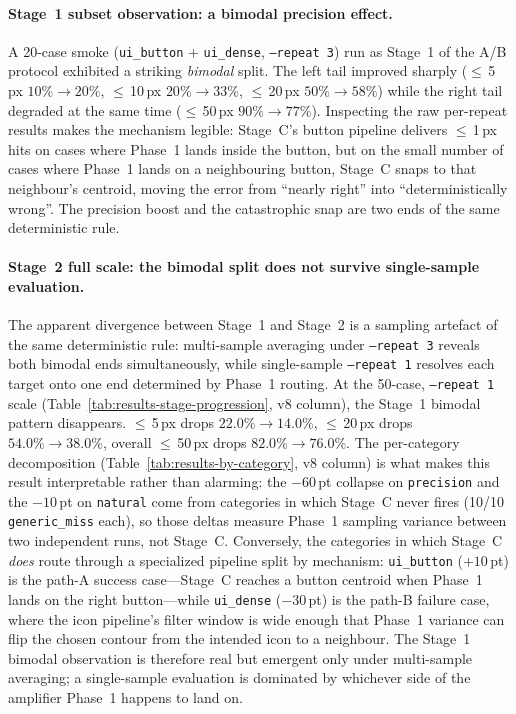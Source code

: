 \paragraph{Stage~1 subset observation: a bimodal precision effect.}
A 20-case smoke (\texttt{ui\_button} + \texttt{ui\_dense},
\texttt{--repeat 3}) run as Stage~1 of the A/B protocol exhibited a
striking \emph{bimodal} split.  The left tail improved sharply
($\leq$\,5\,px $10\% \to 20\%$, $\leq$\,10\,px $20\% \to 33\%$,
$\leq$\,20\,px $50\% \to 58\%$) while the right tail degraded at the
same time ($\leq$\,50\,px $90\% \to 77\%$).  Inspecting the raw
per-repeat results makes the mechanism legible: Stage~C's button
pipeline delivers $\leq$\,1\,px hits on cases where Phase~1 lands
inside the button, but on the small number of cases where Phase~1
lands on a neighbouring button, Stage~C snaps to that neighbour's
centroid, moving the error from ``nearly right'' into
``deterministically wrong''.  The precision boost and the
catastrophic snap are two ends of the same deterministic rule.

\paragraph{Stage~2 full scale: the bimodal split does not survive
  single-sample evaluation.}
The apparent divergence between Stage~1 and Stage~2 is a sampling
artefact of the same deterministic rule: multi-sample averaging under
\texttt{--repeat 3} reveals both bimodal ends simultaneously, while
single-sample \texttt{--repeat 1} resolves each target onto one end
determined by Phase~1 routing.
At the 50-case, \texttt{--repeat 1} scale
(Table~\ref{tab:results-stage-progression}, v8 column), the Stage~1 bimodal pattern
disappears.  $\leq$\,5\,px drops $22.0\% \to 14.0\%$, $\leq$\,20\,px
drops $54.0\% \to 38.0\%$, overall $\leq$\,50\,px drops
$82.0\% \to 76.0\%$.  The per-category decomposition
(Table~\ref{tab:results-by-category}, v8 column) is what makes this result
interpretable rather than alarming: the $-60$\,pt collapse on
\texttt{precision} and the $-10$\,pt on \texttt{natural} come from
categories in which Stage~C never fires (10/10
\texttt{generic\_miss} each), so those deltas measure Phase~1
sampling variance between two independent runs, not Stage~C.
Conversely, the categories in which Stage~C \emph{does} route
through a specialized pipeline split by mechanism:
\texttt{ui\_button} ($+10$\,pt) is the path-A success case---Stage~C
reaches a button centroid when Phase~1 lands on the right
button---while \texttt{ui\_dense} ($-30$\,pt) is the path-B failure
case, where the icon pipeline's filter window is wide enough that
Phase~1 variance can flip the chosen contour from the intended icon
to a neighbour.  The Stage~1 bimodal observation is therefore real
but emergent only under multi-sample averaging; a single-sample
evaluation is dominated by whichever side of the amplifier Phase~1
happens to land on.

